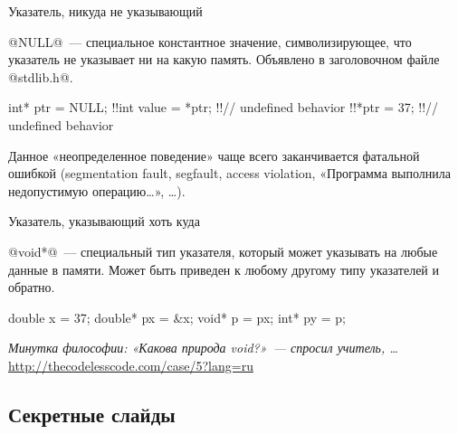 \begin{frame}[fragile]{Указатель, никуда не указывающий}

  @NULL@~--- специальное константное значение, символизирующее, что указатель
  не указывает ни на какую память.
  Объявлено в заголовочном файле @stdlib.h@.

  \begin{clisting}[escapechar=\!]
    int* ptr = NULL;
    !!int value = *ptr; !!// undefined behavior
    !!*ptr = 37; !!// undefined behavior
  \end{clisting}

  Данное «неопределенное поведение» чаще всего заканчивается фатальной ошибкой
  (segmentation fault, segfault, access violation,
  «Программа выполнила недопустимую операцию…», …).

\end{frame}

\begin{frame}[fragile]{Указатель, указывающий хоть куда}

  @void*@~--- специальный тип указателя, который может указывать на любые
  данные в памяти.
  Может быть приведен к любому другому типу указателей и обратно.

  \begin{clisting}[escapechar=\!]
    double x = 37;
    double* px = &x;
    void* p = px;
    int* py = p;
  \end{clisting}

  \pause

  \vspace{1em}
  \emph{Минутка философии: «Какова природа void?»~--- спросил учитель, …}
  \url{http://thecodelesscode.com/case/5?lang=ru}

\end{frame}




\begin{backup}

\section{Секретные слайды}


\end{backup}



